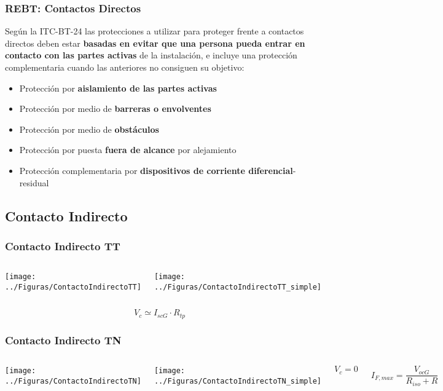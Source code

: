 \documentclass[serif, xcolor=dvipsnames]{beamer}
\begin{document}
\begin{frame}
\frametitle{REBT: Contactos Directos}

Según la ITC-BT-24 las protecciones a utilizar para proteger frente
a contactos directos deben estar \textbf{basadas en evitar que una
persona pueda entrar en contacto con las partes activas} de la instalación,
e incluye una protección complementaria cuando las anteriores no consiguen
su objetivo:
\begin{itemize}
\item Protección por \textbf{aislamiento de las partes activas}
\item Protección por medio de \textbf{barreras o envolventes}
\item Protección por medio de \textbf{obstáculos}
\item Protección por puesta \textbf{fuera de alcance} por alejamiento
\item Protección complementaria por \textbf{dispositivos de corriente diferencial}-residual 
\end{itemize}

\end{frame}

\subsection{Contacto Indirecto}


\begin{frame}
\frametitle{Contacto Indirecto TT}
\begin{columns}[t]%


\column{6cm}

\texttt{[image: ../Figuras/ContactoIndirectoTT]}


\column{4cm}

\texttt{[image: ../Figuras/ContactoIndirectoTT\_simple]}

\end{columns}%
\[
V_{c}\simeq I_{scG}\cdot R_{tp}\]



\end{frame}

\begin{frame}
\frametitle{Contacto Indirecto TN}
\begin{columns}[t]%


\column{6cm}

\texttt{[image: ../Figuras/ContactoIndirectoTN]}


\column{4cm}

\texttt{[image: ../Figuras/ContactoIndirectoTN\_simple]}

\[
V_{c}=0\]


\[
I_{F,max}=\frac{V_{ocG}}{R_{iso}+R}\]


\end{columns}%

\end{frame}
\end{document}
